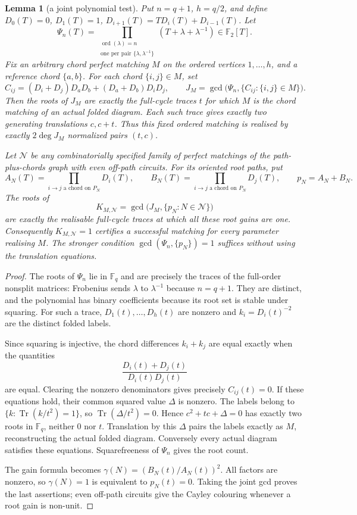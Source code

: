\documentclass[11pt,a4paper]{article}
\newtheorem{lemma}[theorem]{Lemma}
\theoremstyle{definition}
\theoremstyle{remark}
\begin{document}
\begin{lemma}[a joint polynomial test]\label{lem:borel-polynomial-test}
Put $n=q+1$, $h=q/2$, and define $D_0(T)=0$, $D_1(T)=1$, $D_{i+1}(T)=TD_i(T)+D_{i-1}(T)$.  Let
\[
 \Psi_n(T)=\prod_{\substack{\operatorname{ord}(\lambda)=n\\
                         \text{one per pair }\{\lambda,\lambda^{-1}\}}}
                   (T+\lambda+\lambda^{-1})\in\mathbb F_2[T].
\]
Fix an arbitrary chord perfect matching $M$ on the ordered vertices $1,\ldots,h$, and a reference chord $\{a,b\}$.  For each chord $\{i,j\}\in M$, set
\[
 C_{ij}=(D_i+D_j)D_aD_b+(D_a+D_b)D_iD_j,
 \qquad J_M=\gcd\bigl(\Psi_n,\{C_{ij}:\{i,j\}\in M\}\bigr).
\]
Then the roots of $J_M$ are exactly the full-cycle traces $t$ for which $M$ is the chord matching of an actual folded diagram.  Each such trace gives exactly two generating translations $c,c+t$.  Thus this fixed ordered matching is realised by exactly $2\deg J_M$ normalized pairs $(t,c)$.

Let $\mathcal N$ be any combinatorially specified family of perfect matchings of the path-plus-chords graph with even off-path circuits.  For its oriented root paths, put
\[
 A_N(T)=\prod_{i\to j\text{ a chord on }P_N}D_i(T),\qquad
 B_N(T)=\prod_{i\to j\text{ a chord on }P_N}D_j(T),\qquad
 p_N=A_N+B_N.
\]
The roots of
\[
             K_{M,\mathcal N}=\gcd\bigl(J_M,\{p_N:N\in\mathcal N\}\bigr)
\]
are exactly the realisable full-cycle traces at which all these root gains are one.  Consequently $K_{M,\mathcal N}=1$ certifies a successful matching for every parameter realising $M$.  The stronger condition $\gcd(\Psi_n,\{p_N\})=1$ suffices without using the translation equations.
\end{lemma}
\begin{proof}
The roots of $\Psi_n$ lie in $\mathbb F_q$ and are precisely the traces of the full-order nonsplit matrices: Frobenius sends $\lambda$ to $\lambda^{-1}$ because $n=q+1$.  They are distinct, and the polynomial has binary coefficients because its root set is stable under squaring.  For such a trace, $D_1(t),\ldots,D_h(t)$ are nonzero and $k_i=D_i(t)^{-2}$ are the distinct folded labels.

Since squaring is injective, the chord differences $k_i+k_j$ are equal exactly when the quantities
\[
                    \frac{D_i(t)+D_j(t)}{D_i(t)D_j(t)}
\]
are equal.  Clearing the nonzero denominators gives precisely $C_{ij}(t)=0$.  If these equations hold, their common squared value $\Delta$ is nonzero.  The labels belong to $\{k:\operatorname{Tr}(k/t^2)=1\}$, so $\operatorname{Tr}(\Delta/t^2)=0$.  Hence $c^2+tc+\Delta=0$ has exactly two roots in $\mathbb F_q$, neither $0$ nor $t$.  Translation by this $\Delta$ pairs the labels exactly as $M$, reconstructing the actual folded diagram.  Conversely every actual diagram satisfies these equations.  Squarefreeness of $\Psi_n$ gives the root count.

The gain formula becomes $\gamma(N)=(B_N(t)/A_N(t))^2$.  All factors are nonzero, so $\gamma(N)=1$ is equivalent to $p_N(t)=0$.  Taking the joint gcd proves the last assertions; even off-path circuits give the Cayley colouring whenever a root gain is non-unit.
\end{proof}
\end{document}
